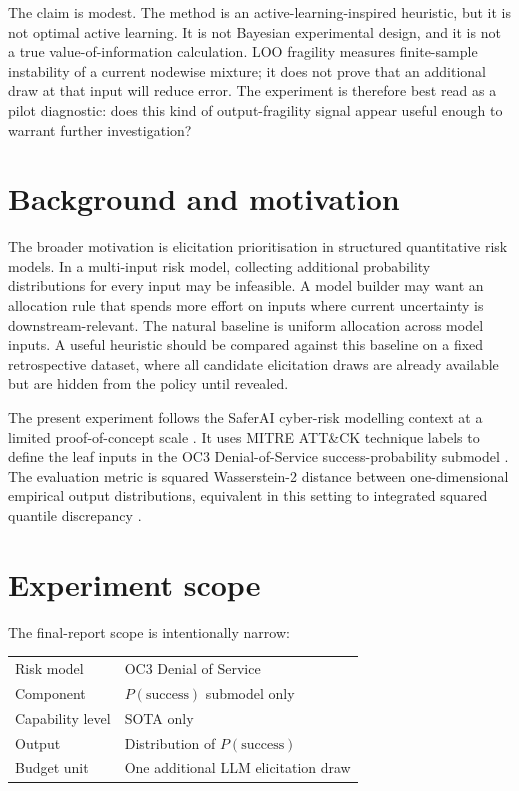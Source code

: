 \documentclass[11pt]{article}
\newcommand{\psuccess}{P(\mathrm{success})}
\begin{document}
The claim is modest. The method is an active-learning-inspired heuristic, but it is not optimal active learning. It is not Bayesian experimental design, and it is not a true value-of-information calculation. LOO fragility measures finite-sample instability of a current nodewise mixture; it does not prove that an additional draw at that input will reduce error. The experiment is therefore best read as a pilot diagnostic: does this kind of output-fragility signal appear useful enough to warrant further investigation?

\section{Background and motivation}

The broader motivation is elicitation prioritisation in structured quantitative risk models. In a multi-input risk model, collecting additional probability distributions for every input may be infeasible. A model builder may want an allocation rule that spends more effort on inputs where current uncertainty is downstream-relevant. The natural baseline is uniform allocation across model inputs. A useful heuristic should be compared against this baseline on a fixed retrospective dataset, where all candidate elicitation draws are already available but are hidden from the policy until revealed.

The present experiment follows the SaferAI cyber-risk modelling context at a limited proof-of-concept scale \citep{saferai-methodology-placeholder, saferai-cyber-risk-placeholder}. It uses MITRE ATT\&CK technique labels to define the leaf inputs in the OC3 Denial-of-Service success-probability submodel \citep{mitre-attack}. The evaluation metric is squared Wasserstein-2 distance between one-dimensional empirical output distributions, equivalent in this setting to integrated squared quantile discrepancy \citep{villani2009optimal}.

\section{Experiment scope}

The final-report scope is intentionally narrow:

\begin{center}
\begin{tabular}{ll}
\toprule
Risk model & OC3 Denial of Service \\
Component & \(\psuccess\) submodel only \\
Capability level & SOTA only \\
Output & Distribution of \(\psuccess\) \\
Budget unit & One additional LLM elicitation draw \\
\bottomrule
\end{tabular}
\end{center}
\end{document}
